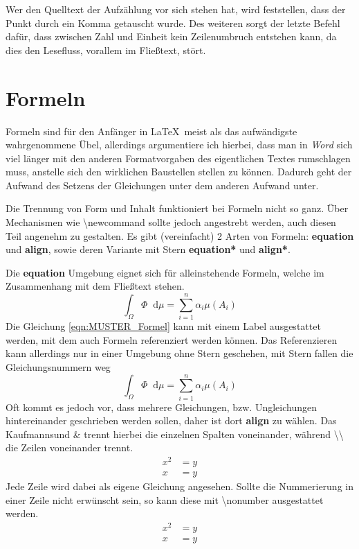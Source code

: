 \documentclass[logo/language=en]{tudcdartcl}
\newcommand{\diff}{\mathop{}\!\mathrm{d}}
\begin{document}
Wer den Quelltext der Aufzählung vor sich stehen hat, wird feststellen, dass der Punkt durch ein Komma getauscht wurde. Des weiteren sorgt der letzte Befehl dafür, dass zwischen Zahl und Einheit kein Zeilenumbruch entstehen kann, da dies den Lesefluss, vorallem im Fließtext, stört.

\section{Formeln}

Formeln sind für den Anfänger in \LaTeX\, meist als das aufwändigste wahrgenommene Übel, allerdings argumentiere ich hierbei,
dass man in \textit{Word} sich viel länger mit den anderen Formatvorgaben des eigentlichen Textes rumschlagen muss,
anstelle sich den wirklichen Baustellen stellen zu können. Dadurch geht der Aufwand des Setzens der Gleichungen unter dem anderen Aufwand unter.

Die Trennung von Form und Inhalt funktioniert bei Formeln nicht so ganz. Über Mechanismen wie \textbackslash newcommand sollte jedoch angestrebt werden, auch diesen Teil angenehm zu gestalten.
Es gibt (vereinfacht) 2 Arten von Formeln: \textbf{equation} und \textbf{align}, sowie deren Variante mit Stern \textbf{equation*} und \textbf{align*}.

Die \textbf{equation} Umgebung eignet sich für alleinstehende Formeln, welche im Zusammenhang mit dem Fließtext stehen.
\begin{equation}
    \int_{\Omega} \Phi \diff \mu = \sum_{i=1}^n \alpha_i \mu (A_i) \label{eqn:MUSTER_Formel}
\end{equation}
Die Gleichung \ref{eqn:MUSTER_Formel} kann mit einem Label ausgestattet werden, mit dem auch Formeln referenziert werden können. Das Referenzieren kann allerdings nur in einer Umgebung ohne Stern geschehen, mit Stern fallen die Gleichungsnummern weg
\begin{equation*}
    \int_{\Omega} \Phi \diff \mu = \sum_{i=1}^n \alpha_i \mu (A_i)
\end{equation*}
Oft kommt es jedoch vor, dass mehrere Gleichungen, bzw. Ungleichungen hintereinander geschrieben werden sollen, daher ist dort \textbf{align} zu wählen. Das Kaufmannsund \& trennt hierbei die einzelnen Spalten voneinander, während \textbackslash\textbackslash\, die Zeilen voneinander trennt. \begin{align}
    x^2 &= y \\
    x   &= y
\end{align}
Jede Zeile wird dabei als eigene Gleichung angesehen. Sollte die Nummerierung in einer Zeile nicht erwünscht sein, so kann diese mit \textbackslash nonumber ausgestattet werden. \begin{align}
    x^2 &= y \\
    x   &= y \nonumber
\end{align}
\end{document}
